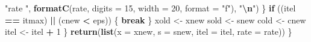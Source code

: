 \documentclass[
  12pt,
]{article}
\newenvironment{Shaded}{\begin{snugshade}}{\end{snugshade}}
\newcommand{\AttributeTok}[1]{\textcolor[rgb]{0.13,0.29,0.53}{#1}}
\newcommand{\ControlFlowTok}[1]{\textcolor[rgb]{0.13,0.29,0.53}{\textbf{#1}}}
\newcommand{\DecValTok}[1]{\textcolor[rgb]{0.00,0.00,0.81}{#1}}
\newcommand{\FunctionTok}[1]{\textcolor[rgb]{0.13,0.29,0.53}{\textbf{#1}}}
\newcommand{\NormalTok}[1]{#1}
\newcommand{\OtherTok}[1]{\textcolor[rgb]{0.56,0.35,0.01}{#1}}
\newcommand{\SpecialCharTok}[1]{\textcolor[rgb]{0.81,0.36,0.00}{\textbf{#1}}}
\newcommand{\StringTok}[1]{\textcolor[rgb]{0.31,0.60,0.02}{#1}}
\begin{document}
\begin{Shaded}
\begin{Highlighting}[]
          \StringTok{"rate "}\NormalTok{, }\FunctionTok{formatC}\NormalTok{(rate, }\AttributeTok{digits =} \DecValTok{15}\NormalTok{, }\AttributeTok{width =} \DecValTok{20}\NormalTok{, }\AttributeTok{format =} \StringTok{"f"}\NormalTok{),}
          \StringTok{"}\SpecialCharTok{\textbackslash{}n}\StringTok{"}\NormalTok{)}
\NormalTok{      \}}
      \ControlFlowTok{if}\NormalTok{ ((itel }\SpecialCharTok{==}\NormalTok{ itmax) }\SpecialCharTok{||}\NormalTok{ (cnew }\SpecialCharTok{\textless{}}\NormalTok{ eps)) \{}
        \ControlFlowTok{break}
\NormalTok{      \}}
\NormalTok{      xold }\OtherTok{\textless{}{-}}\NormalTok{ xnew}
\NormalTok{      sold }\OtherTok{\textless{}{-}}\NormalTok{ snew}
\NormalTok{      cold }\OtherTok{\textless{}{-}}\NormalTok{ cnew}
\NormalTok{      itel }\OtherTok{\textless{}{-}}\NormalTok{ itel }\SpecialCharTok{+} \DecValTok{1}
\NormalTok{    \}}
    \FunctionTok{return}\NormalTok{(}\FunctionTok{list}\NormalTok{(}\AttributeTok{x =}\NormalTok{ xnew, }\AttributeTok{s =}\NormalTok{ snew, }\AttributeTok{itel =}\NormalTok{ itel, }\AttributeTok{rate =}\NormalTok{ rate))}
\NormalTok{  \}}


\end{Highlighting}
\end{Shaded}
\end{document}
